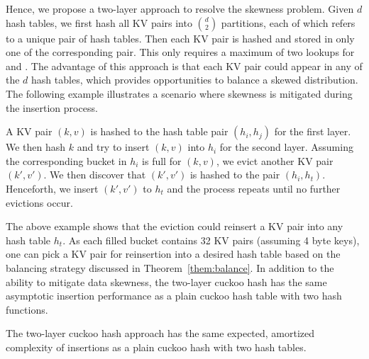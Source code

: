Hence, we propose a two-layer approach to resolve the skewness problem.
Given $d$ hash tables, we first hash all KV pairs into $\binom{d}{2}$ partitions, 
each of which refers to a unique pair of hash tables. Then each KV pair is hashed and stored in only one of the corresponding pair. This only requires a maximum of two lookups for  and . The advantage of this approach is that each KV pair could appear in any of the $d$ hash tables, which provides opportunities to balance a skewed distribution. The following example illustrates a scenario where skewness is mitigated during the insertion process. 

\begin{example}
A KV pair $(k,v)$ is hashed to the hash table pair $(h_i,h_j)$ for the first layer. We then hash $k$ and try to insert $(k,v)$ into $h_i$ for the second layer. Assuming the corresponding bucket in $h_i$ is full for $(k,v)$, we evict another KV pair $(k',v')$. We then discover that $(k',v')$ is hashed to the pair $(h_i,h_t)$. Henceforth, we insert $(k',v')$ to $h_t$ and the process repeats until no further evictions occur.
\end{example}

The above example shows that the eviction could reinsert a KV pair into any hash table $h_t$. As each filled bucket contains 32 KV pairs (assuming 4 byte keys), one can pick a KV pair for reinsertion into a desired hash table based on the balancing strategy discussed in Theorem~\ref{them:balance}. In addition to the ability to mitigate data skewness, the two-layer cuckoo hash has the same asymptotic insertion performance as a plain cuckoo hash table with two hash functions.  

\begin{theorem}\label{them:complexity}
The two-layer cuckoo hash approach has the same expected, amortized complexity of insertions as a plain cuckoo hash with two hash tables. 
\end{theorem}

